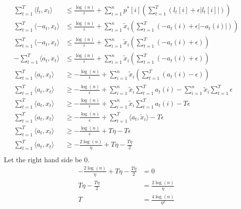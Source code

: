 \documentclass[11pt]{article}
\newenvironment{qparts}{\begin{enumerate}[{(}a{)}]}{\end{enumerate}}
\begin{document}
\begin{qparts}
	\begin{align*}
		\sum_{t=1}^T \langle l_t,x_t \rangle
		&\le
		\frac{\log(n)}{\epsilon} + \sum_{i=1}^n p^*[i]( \sum_{t=1}^T(l_t[i] + \epsilon | l_t[i] | )) \\
		\sum_{t=1}^T \langle -a_t,x_t \rangle
		&\le
		\frac{\log(n)}{\epsilon} + \sum_{i=1}^n \widetilde x_i( \sum_{t=1}^T(-a_t(i) + \epsilon | -a_t(i) | )) \\
		\sum_{t=1}^T \langle -a_t,x_t \rangle
		&\le
		\frac{\log(n)}{\epsilon} + \sum_{i=1}^n \widetilde x_i( \sum_{t=1}^T(-a_t(i)+ \epsilon)) \\
		-\sum_{t=1}^T \langle a_t,x_t \rangle
		&\le
		\frac{\log(n)}{\epsilon} + \sum_{i=1}^n \widetilde x_i( \sum_{t=1}^T(-a_t(i) + \epsilon)) \\
		\sum_{t=1}^T \langle a_t,x_t \rangle
		&\ge
		-\frac{\log(n)}{\epsilon} + \sum_{i=1}^n \widetilde x_i( \sum_{t=1}^T(a_t(i) - \epsilon)) \\
		\sum_{t=1}^T \langle a_t,x_t \rangle
		&\ge
		-\frac{\log(n)}{\epsilon} 
		+ \sum_{i=1}^n \widetilde x_i \sum_{t=1}^T a_t(i)
		-  \sum_{i=1}^n \widetilde x_i \sum_{t=1}^T \epsilon \\
		\sum_{t=1}^T \langle a_t,x_t \rangle
		&\ge
		-\frac{\log(n)}{\epsilon} 
		+ \sum_{i=1}^n \widetilde x_i \sum_{t=1}^T a_t(i)
		- T \epsilon \\
		\sum_{t=1}^T \langle a_t,x_t \rangle
		&\ge
		-\frac{\log(n)}{\epsilon} 
		+ \sum_{t=1}^T \langle a_t,\widetilde x_i \rangle
		- T \epsilon \\
		\sum_{t=1}^T \langle a_t,x_t \rangle
		&\ge
		-\frac{\log(n)}{\epsilon} 
		+ T \eta
		- T \epsilon \\
		\sum_{t=1}^T \langle a_t,x_t \rangle
		&\ge
		-\frac{2\log(n)}{\eta} 
		+ T \eta
		- \frac{T \eta}{2} \\
	\end{align*}
	Let the right hand side be 0.
	\begin{align*}
		-\frac{2\log(n)}{\eta} 
		+ T \eta
		- \frac{T \eta}{2} 
		&=
		0 \\
		T \eta
		- \frac{T \eta}{2} 
		&=
		\frac{2\log(n)}{\eta}  \\
		T
		&=
		\frac{4\log(n)}{\eta^2}  \\	
	\end{align*}
\end{qparts}
\end{document}
